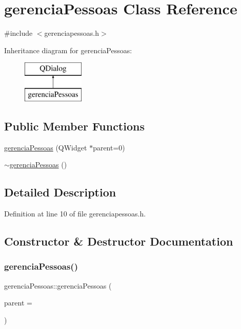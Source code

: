 \hypertarget{classgerencia_pessoas}{}\section{gerencia\+Pessoas Class Reference}
\label{classgerencia_pessoas}


{\ttfamily \#include $<$gerenciapessoas.\+h$>$}

Inheritance diagram for gerencia\+Pessoas\+:\begin{figure}[H]
\begin{center}
\leavevmode
\includegraphics[height=2.000000cm]{classgerencia_pessoas}
\end{center}
\end{figure}
\subsection*{Public Member Functions}
\begin{DoxyCompactItemize}
\item 
\hyperlink{classgerencia_pessoas_a245ab3e4006fcdd3ec9a89815e1c60c1}{gerencia\+Pessoas} (Q\+Widget $\ast$parent=0)
\item 
\hyperlink{classgerencia_pessoas_a85f9272a309472903bf5b2ad0950973c}{$\sim$gerencia\+Pessoas} ()
\end{DoxyCompactItemize}


\subsection{Detailed Description}


Definition at line 10 of file gerenciapessoas.\+h.



\subsection{Constructor \& Destructor Documentation}
\hypertarget{classgerencia_pessoas_a245ab3e4006fcdd3ec9a89815e1c60c1}{}\label{classgerencia_pessoas_a245ab3e4006fcdd3ec9a89815e1c60c1} 
\subsubsection{\texorpdfstring{gerencia\+Pessoas()}{gerenciaPessoas()}}
{\footnotesize\ttfamily gerencia\+Pessoas\+::gerencia\+Pessoas (\begin{DoxyParamCaption}\item[{Q\+Widget $\ast$}]{parent = {} }\end{DoxyParamCaption})\hspace{0.3cm}{\ttfamily [explicit]}}



